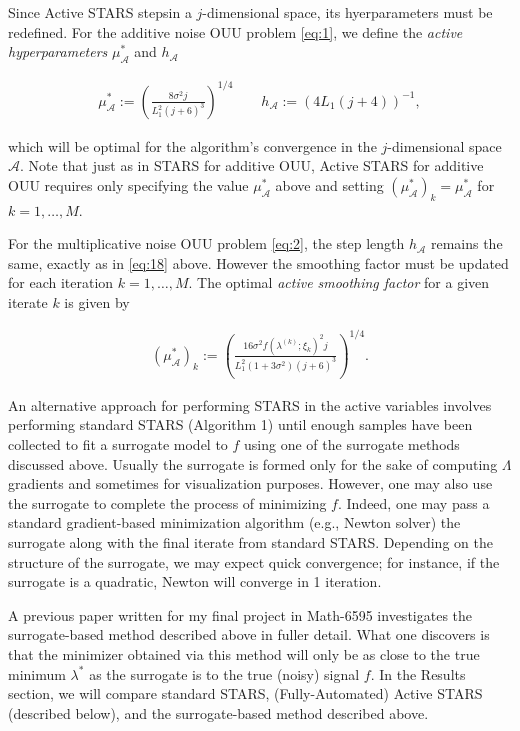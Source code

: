 \documentclass{amsart}
\newcommand{\A}{\mathcal{A}}
\begin{document}
\vspace{.25cm}

Since Active STARS stepsin a $j$-dimensional space, its hyerparameters must be redefined. For the additive noise OUU problem \eqref{eq:1}, we define the \textit{active hyperparameters} $\mu_\A^*$ and $h_\A$

\begin{eqnarray} \label{eq:18}
\mu_\A^*:=\left( \frac{8\sigma^2 j}{L_1^2(j+6)^3}\right)^{1/4} \quad \quad h_\A:=(4L_1(j+4))^{-1},
\end{eqnarray} 

\noindent which will be optimal \cite{CW} for the algorithm's convergence in the $j$-dimensional space $\A.$ Note that just as in STARS for additive OUU, Active STARS for additive OUU requires only specifying the value $\mu_\A^*$ above and setting $(\mu^*_\A)_k=\mu_\A^*$ for $k=1,\ldots, M.$

For the multiplicative noise OUU problem \eqref{eq:2}, the step length $h_\A$ remains the same, exactly as in \eqref{eq:18} above. However the smoothing factor must be updated for each iteration $k=1,\ldots, M.$ The optimal \textit{active smoothing factor} for a given iterate $k$ is given by

\begin{eqnarray} \label{eq:19}
(\mu_\A^*)_k:=\left( \frac{16 \sigma^2 f(\lambda^{(k)};\xi_k)^2 j}{L_1^2(1+3\sigma^2)(j+6)^3}\right)^{1/4}.
\end{eqnarray} 

An alternative approach for performing STARS in the active variables involves performing standard STARS (Algorithm 1) until enough samples have been collected to fit a surrogate model to $f$ using one of the surrogate methods discussed above. Usually the surrogate is formed only for the sake of computing $\Lambda$ gradients and sometimes for visualization purposes. However, one may also use the surrogate to complete the process of minimizing $f$. Indeed, one may pass a standard gradient-based minimization algorithm (e.g., Newton solver) the surrogate along with the final iterate from standard STARS. Depending on the structure of the surrogate, we may expect quick convergence; for instance, if the surrogate is a quadratic, Newton will converge in 1 iteration.

A previous paper written for my final project in Math-6595 investigates the surrogate-based method described above in fuller detail. What one discovers is that the minimizer obtained via this method will only be as close to the true minimum $\lambda^*$ as the surrogate is to the true (noisy) signal $f$. In the Results section, we will compare standard STARS, (Fully-Automated) Active STARS (described below), and the surrogate-based method described above.
\end{document}
